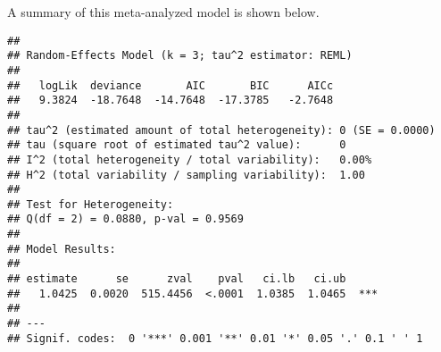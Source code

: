 \documentclass[
]{book}
\newenvironment{Shaded}{\begin{snugshade}}{\end{snugshade}}
\newcommand{\DataTypeTok}[1]{\textcolor[rgb]{0.13,0.29,0.53}{#1}}
\newcommand{\DecValTok}[1]{\textcolor[rgb]{0.00,0.00,0.81}{#1}}
\newcommand{\KeywordTok}[1]{\textcolor[rgb]{0.13,0.29,0.53}{\textbf{#1}}}
\newcommand{\NormalTok}[1]{#1}
\newcommand{\OperatorTok}[1]{\textcolor[rgb]{0.81,0.36,0.00}{\textbf{#1}}}
\newcommand{\StringTok}[1]{\textcolor[rgb]{0.31,0.60,0.02}{#1}}
\begin{document}
\begin{Shaded}
\end{Shaded}

A summary of this meta-analyzed model is shown below.

\begin{verbatim}
## 
## Random-Effects Model (k = 3; tau^2 estimator: REML)
## 
##   logLik  deviance       AIC       BIC      AICc 
##   9.3824  -18.7648  -14.7648  -17.3785   -2.7648   
## 
## tau^2 (estimated amount of total heterogeneity): 0 (SE = 0.0000)
## tau (square root of estimated tau^2 value):      0
## I^2 (total heterogeneity / total variability):   0.00%
## H^2 (total variability / sampling variability):  1.00
## 
## Test for Heterogeneity:
## Q(df = 2) = 0.0880, p-val = 0.9569
## 
## Model Results:
## 
## estimate      se      zval    pval   ci.lb   ci.ub 
##   1.0425  0.0020  515.4456  <.0001  1.0385  1.0465  *** 
## 
## ---
## Signif. codes:  0 '***' 0.001 '**' 0.01 '*' 0.05 '.' 0.1 ' ' 1
\end{verbatim}
\end{document}
